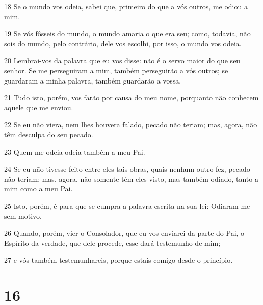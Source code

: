 \par 18 Se o mundo vos odeia, sabei que, primeiro do que a vós outros, me odiou a mim.
\par 19 Se vós fôsseis do mundo, o mundo amaria o que era seu; como, todavia, não sois do mundo, pelo contrário, dele vos escolhi, por isso, o mundo vos odeia.
\par 20 Lembrai-vos da palavra que eu vos disse: não é o servo maior do que seu senhor. Se me perseguiram a mim, também perseguirão a vós outros; se guardaram a minha palavra, também guardarão a vossa.
\par 21 Tudo isto, porém, vos farão por causa do meu nome, porquanto não conhecem aquele que me enviou.
\par 22 Se eu não viera, nem lhes houvera falado, pecado não teriam; mas, agora, não têm desculpa do seu pecado.
\par 23 Quem me odeia odeia também a meu Pai.
\par 24 Se eu não tivesse feito entre eles tais obras, quais nenhum outro fez, pecado não teriam; mas, agora, não somente têm eles visto, mas também odiado, tanto a mim como a meu Pai.
\par 25 Isto, porém, é para que se cumpra a palavra escrita na sua lei: Odiaram-me sem motivo.
\par 26 Quando, porém, vier o Consolador, que eu vos enviarei da parte do Pai, o Espírito da verdade, que dele procede, esse dará testemunho de mim;
\par 27 e vós também testemunhareis, porque estais comigo desde o princípio.

\chapter{16}

